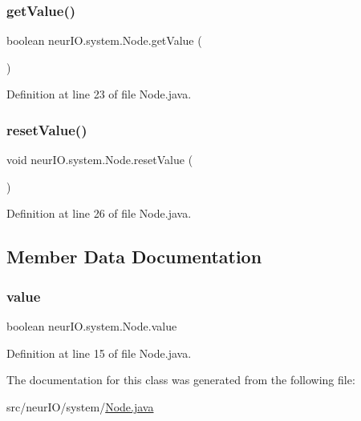 \subsubsection{\texorpdfstring{get\+Value()}{getValue()}}
{\footnotesize\ttfamily boolean neur\+I\+O.\+system.\+Node.\+get\+Value (\begin{DoxyParamCaption}{ }\end{DoxyParamCaption})}



Definition at line 23 of file Node.\+java.

\mbox{\label{classneur_i_o_1_1system_1_1_node_afd4bea06756a10a4dc05dc06afdcd459}} 
\subsubsection{\texorpdfstring{reset\+Value()}{resetValue()}}
{\footnotesize\ttfamily void neur\+I\+O.\+system.\+Node.\+reset\+Value (\begin{DoxyParamCaption}{ }\end{DoxyParamCaption})}



Definition at line 26 of file Node.\+java.



\subsection{Member Data Documentation}
\mbox{\label{classneur_i_o_1_1system_1_1_node_a2c6a229d3d2cbf1b313d8797b70e487a}} 
\subsubsection{\texorpdfstring{value}{value}}
{\footnotesize\ttfamily boolean neur\+I\+O.\+system.\+Node.\+value\hspace{0.3cm}{\ttfamily [protected]}}



Definition at line 15 of file Node.\+java.



The documentation for this class was generated from the following file\+:\begin{DoxyCompactItemize}
\item 
src/neur\+I\+O/system/\hyperlink{_node_8java}{Node.\+java}\end{DoxyCompactItemize}
